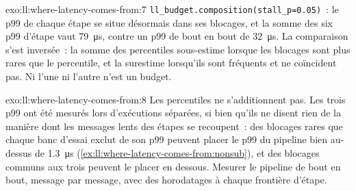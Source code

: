 \begin{solution}{exo:ll:where-latency-comes-from:7}
\texttt{ll\_budget.composition(stall\_p=0.05)}~: le p99 de chaque étape se situe désormais dans ses blocages, et la somme des six
p99 d'étape vaut \qty{79}{\micro\second}, contre un p99 de bout en bout de \qty{32}{\micro\second}. La comparaison s'est inversée~: la
somme des percentiles sous-estime lorsque les blocages sont plus rares que le percentile, et la surestime lorsqu'ils sont fréquents et ne
coïncident pas. Ni l'une ni l'autre n'est un budget.
\end{solution}

\begin{solution}{exo:ll:where-latency-comes-from:8}
Les percentiles ne s'additionnent pas. Les trois p99 ont été mesurés lors d'exécutions séparées, si bien qu'ils ne disent rien de la manière dont les messages lents des étapes
se recoupent~: des blocages rares que chaque banc d'essai exclut de son p99 peuvent placer le p99 du pipeline bien au-dessus de
\qty{1.3}{\micro\second} (\cref{ex:ll:where-latency-comes-from:nonsub}), et des blocages communs aux trois peuvent le placer
en dessous. Mesurer le pipeline de bout en bout, message par message, avec des horodatages à chaque frontière d'étape.
\end{solution}

